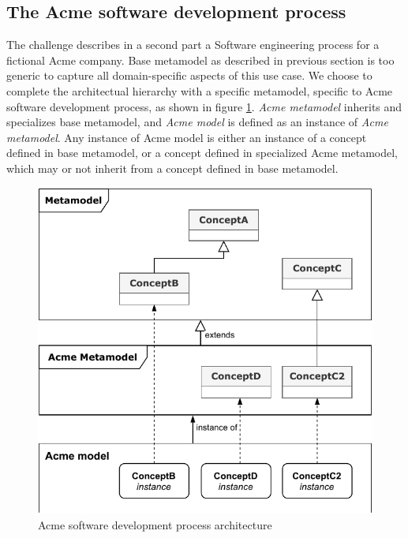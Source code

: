 \subsection{The Acme software development process}
\label{sec:AcmeSoftwareDevelopmentProcess}

The challenge describes in a second part a Software engineering process for a fictional Acme company. Base metamodel as described in previous section is too generic to capture all domain-specific aspects of this use case. We choose to complete the architectual hierarchy with a specific metamodel, specific to Acme software development process, as shown in figure \ref{fig:AcmeArchitecture}. \textit{Acme metamodel} inherits and specializes base metamodel, and \textit{Acme model} is defined as an instance of \textit{Acme metamodel}. Any instance of Acme model is either an instance of a concept defined in base metamodel, or a concept defined in specialized Acme metamodel, which may or not inherit from a concept defined in base metamodel.

\begin{figure}
 \centering
    \includegraphics[width=1.0 \columnwidth]{Figures/AcmeArchitecture.pdf}
     \caption{Acme software development process architecture}
    \label{fig:AcmeArchitecture}
\end{figure}

